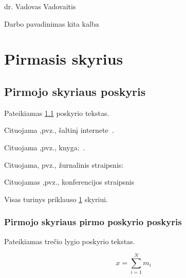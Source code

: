 \documentclass[a4paper,12pt,fleqn]{article}
\begin{document}
 {}{}{}{}%
{dr. Vadovas Vadovaitis}

\tableofcontents



\bothabstracts{}%
{Darbo pavadinimas kita kalba} %
{}%






\newpage
\section{Pirmasis skyrius}\label{sec:motivation}

\subsection{Pirmojo skyriaus poskyris}\label{sec:example}

Pateikiamas \ref{sec:example} poskyrio tekstas. 

Cituojama ,pvz., šaltinį internete~\cite{KTZ}.

Cituojama ,pvz., knyga:~\cite{bdkkmt2012}.

Cituojama, pvz., žurnalinis straipsnis:~\cite{Brilingaite201821}

Cituojamas ,pvz., konferencijos straipsnis~\cite{BRILINGAITE2017APP}

Visas turinys priklauso \ref{sec:motivation} skyriui.

\subsubsection{Pirmojo skyriaus pirmo poskyrio poskyris}\label{sec:data}
Pateikiamas trečio lygio poskyrio tekstas.

\begin{equation}
x = \sum_{i=1}^N m_i
\end{equation}
\end{document}
